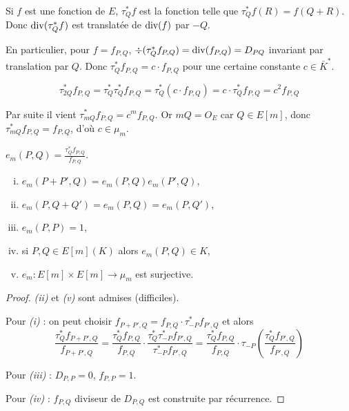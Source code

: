 	Si $f$ est une fonction de $E$, $\tau_Q^* f$ est la fonction telle que $\tau_Q^* f(R) = f(Q + R)$.
	Donc $\operatorname{div}(\tau_Q^* f)$ est translatée de $\operatorname{div}(f)$ par $-Q$.
	
	En particulier, pour $f = f_{P,Q}$, $\div(\tau_Q^* f_{P,Q}) = \operatorname{div}(f_{P,Q}) = D_{PQ}$ invariant par translation par $Q$.
	Donc $\tau_Q^* f_{P,Q} = c \cdot f_{P,Q}$ pour une certaine constante $c \in \bar K^*$.
	
	$$\tau_{2Q}^* f_{P,Q} = \tau_Q^* \tau_Q^* f_{P,Q} = \tau_Q^* (c \cdot f_{P,Q}) = c \cdot \tau_Q^* f_{P,Q} = c^2 f_{P,Q}$$
	
	Par suite il vient $\tau_{mQ}^* f_{P,Q} = c^m f_{P,Q}$.
	Or $mQ = O_E$ car $Q \in E[m]$, donc $\tau_{mQ}^* f_{P,Q} = f_{P,Q}$, d'où $c \in \mu_m$.
	
	\begin{defn}
		$e_m(P,Q) = \frac{\tau_Q^* f_{P,Q}}{f_{P,Q}}$.
	\end{defn}
	
	\begin{thm}
		\begin{enumerate}[(i)]
			\item $e_m(P + P', Q) = e_m(P,Q) e_m(P',Q)$,
			\item $e_m(P, Q + Q') = e_m(P,Q) = e_m(P,Q')$,
			\item $e_m(P,P) = 1$,
			\item si $P,Q \in E[m](K)$ alors $e_m(P,Q) \in K$,
			\item $e_m \colon E[m] \times E[m] \to \mu_m$ est surjective.
		\end{enumerate}
	\end{thm}
	
	\begin{proof}
		\textit{(ii)} et \textit{(v)} sont admises (difficiles).
		
		Pour \textit{(i)} : on peut choisir $f_{P + P',Q} = f_{P,Q} \cdot \tau_{-P}^*  f_{P',Q}$ et alors
		$$\frac{\tau^*_Q f_{P + P',Q}}{f_{P + P',Q}}
			= \frac{\tau_Q^* f_{P,Q}}{f_{P,Q}}
			\cdot \frac{\tau_Q^* \tau_{-P}^* f_{P',Q}}{\tau_{-P}^* f_{P',Q}}
			= \frac{\tau_Q^* f_{P,Q}}{f_{P,Q}}
			\cdot\tau_{-P} \left( \frac{\tau_Q^* f_{P',Q}}{f_{P',Q}} \right)$$
		
		Pour \textit{(iii)} : $D_{P,P} = 0$, $f_{P,P} = 1$.
		
		Pour \textit{(iv)} : $f_{P,Q}$ diviseur de $D_{P,Q}$ est construite par récurrence.
	\end{proof}